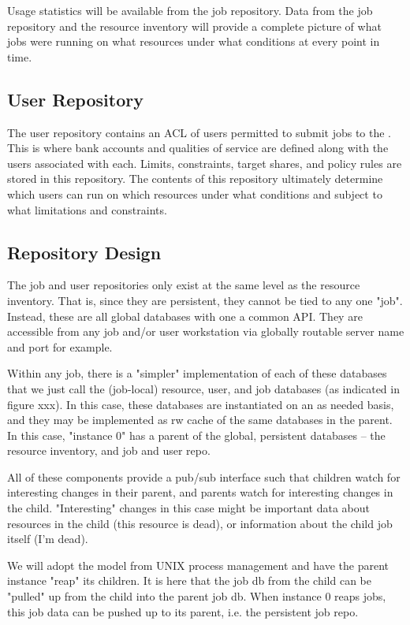 Usage statistics will be available from the job repository.  Data from
the job repository and the resource inventory will provide a complete
picture of what jobs were running on what resources under what
conditions at every point in time.

\subsection{User Repository}

The user repository contains an ACL of users permitted to submit jobs
to the \ngrm.  This is where bank accounts and qualities of service
are defined along with the users associated with each.  Limits,
constraints, target shares, and policy rules are stored in this
repository.  The contents of this repository ultimately determine
which users can run on which resources under what conditions and
subject to what limitations and constraints.

\subsection{Repository Design}

The job and user repositories only exist at the same level as the
resource inventory. That is, since they are persistent, they cannot be
tied to any one "job". Instead, these are all global databases with
one a common API.  They are accessible from any job and/or user
workstation via globally routable server name and port for example.

Within any job, there is a "simpler" implementation of each of these
databases that we just call the (job-local) resource, user, and job
databases (as indicated in figure xxx).  In this case, these databases
are instantiated on an as needed basis, and they may be implemented as
rw cache of the same databases in the parent. In this case, "instance
0" has a parent of the global, persistent databases -- the resource
inventory, and job and user repo.

All of these components provide a pub/sub interface such that children
watch for interesting changes in their parent, and parents watch for
interesting changes in the child. "Interesting" changes in this case
might be important data about resources in the child (this resource is
dead), or information about the child job itself (I'm dead).

We will adopt the model from UNIX process management and have the
parent instance "reap" its children. It is here that the job db from
the child can be "pulled" up from the child into the parent job db.
When instance 0 reaps jobs, this job data can be pushed up to its
parent, i.e. the persistent job repo.

